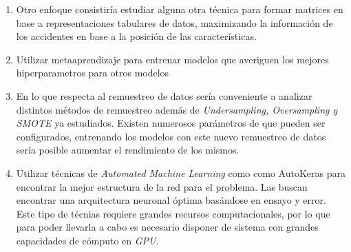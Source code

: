 \begin{enumerate}
		\item Otro enfoque consistiría estudiar alguna otra técnica para formar matrices en base a representaciones tabulares de datos, maximizando la información de los accidentes en base a la posición de las características.

		\item Utilizar metaaprendizaje para entrenar modelos que averiguen los mejores hiperparametros para otros modelos

		\item En lo que respecta al remuestreo de datos sería conveniente a analizar distintos métodos de remuestreo además de \textit{Undersampling, Oversampling y SMOTE} ya estudiados. Existen numerosos parámetros de  que pueden ser configurados, entrenando los modelos con este nuevo remuestreo de datos sería posible aumentar el rendimiento de los mismos.

		\item Utilizar técnicas de \textit{Automated Machine Learning} como  como AutoKeras \cite{AutoKeras} para encontrar la mejor estructura de la red para el problema. Las  buscan encontrar una arquitectura neuronal óptima basándose en ensayo y error. Este tipo de técnias requiere grandes recursos computacionales, por lo que para poder llevarla a cabo es necesario disponer de sistema con grandes capacidades de cómputo en \textit{GPU}.


	\end{enumerate}